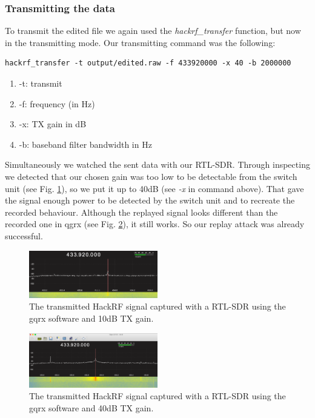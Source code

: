\documentclass[conference]{IEEEtran}
\begin{document}
\subsubsection{Transmitting the data}
To transmit the edited file we again used the \textit{hackrf\_transfer} function, but now in the transmitting mode.  Our transmitting command was the following:
\begin{lstlisting}
hackrf_transfer -t output/edited.raw -f 433920000 -x 40 -b 2000000
\end{lstlisting}
\begin{enumerate}
	\item -t: transmit
	\item -f: frequency (in Hz)
	\item -x: TX gain in dB
	\item -b: baseband filter bandwidth in Hz
\end{enumerate}
Simultaneously we watched the sent data with our RTL-SDR. Through inspecting we detected that our chosen gain was too low to be detectable from the switch unit (see Fig. \ref{fig:hackrf_gqrx_g10}), so we put it up to 40dB (see  \textit{-x} in command above). That gave the signal enough power to be detected by the switch unit and to recreate the recorded behaviour. Although the replayed signal looks different than the recorded one in qgrx (see Fig. \ref{fig:hackrf_gqrx_g40}), it still works. So our replay attack was already successful.

\begin{figure}[H]
	\centering
	\includegraphics[width=0.5\textwidth]{gqrx_hackrf_transmission_gain10}
	\caption{The transmitted HackRF signal captured with a RTL-SDR using the gqrx software and 10dB TX gain.}
	\label{fig:hackrf_gqrx_g10}
\end{figure}

\begin{figure}[H]
	\centering
	\includegraphics[width=0.5\textwidth]{gqrx_hackrf_transmission}
	\caption{The transmitted HackRF signal captured with a RTL-SDR using the gqrx software and 40dB TX gain.}
	\label{fig:hackrf_gqrx_g40}
\end{figure}
\bigbreak
\end{document}
